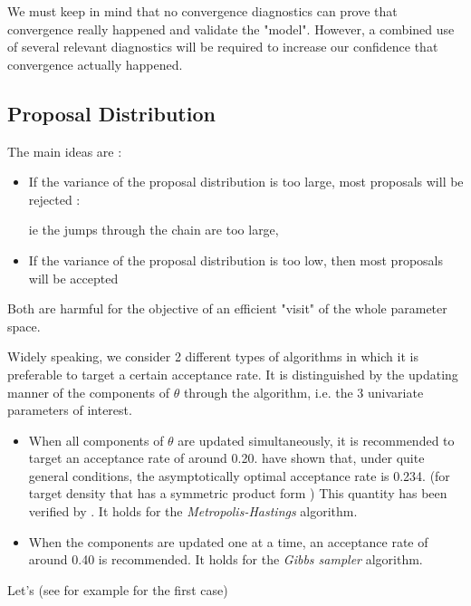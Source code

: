 \documentclass[11pt,a4paper,openany ]{book}
\begin{document}
We must keep in mind that no convergence diagnostics can prove that convergence really happened and validate the "model".
However, a combined use of several relevant diagnostics will be required to increase our confidence that convergence actually happened.

\subsection{Proposal Distribution}



The main ideas are : 

\begin{itemize}
	\item If the variance of the proposal distribution is too large, most proposals will be rejected : 
	
	 ie the jumps through the chain are too large,
	\item If the variance of the proposal distribution is too low, then most proposals will be accepted
\end{itemize}

Both are harmful for the objective of an efficient "visit" of the whole parameter space. 


Widely speaking, we consider 2 different  types of algorithms in which it is preferable to target a certain acceptance rate. It is distinguished by the updating manner of the components of $\theta$ through the algorithm, i.e. the 3 univariate parameters of interest.


\begin{itemize}
	\item When all components of $\theta$ are updated simultaneously, it is recommended to target an acceptance rate of around 0.20.
	 \citet{Roberts_weak_1997} have shown that, under quite general conditions, the asymptotically optimal acceptance rate is 0.234. (for  target density that has a symmetric product form ) 
	This quantity has been verified by \citet{Sherlock_optimal_2009}. It holds for the \emph{Metropolis-Hastings} algorithm.
	
	\item When the components are updated one at a time, an acceptance rate of around 0.40 is recommended. It holds for the\emph{ Gibbs sampler} algorithm. 
\end{itemize}

Let's  (see \citet{Bédard_optimal_2008} for example for the first case)
\end{document}
